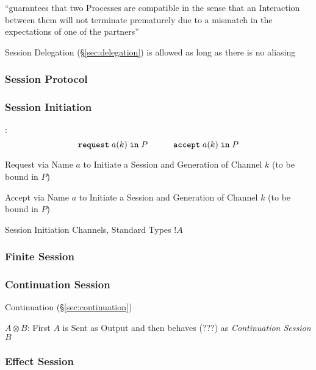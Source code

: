 ``guarantees that two Processes are compatible in the sense that an
Interaction between them will not terminate prematurely due to a
mismatch in the expectations of one of the partners''
\cite{gay-vasconcelos10}

Session Delegation (\S\ref{sec:delegation}) is allowed as long as
there is no aliasing



\subsubsection{Session Protocol}\label{sec:session_protocol}

\subsubsection{Session Initiation}\label{sec:session_initiation}

\cite{honda-vasconcelos-kubo98}:
\[
  \mathtt{request} \; a(k) \; \mathtt{in} \; P
  \quad\quad\quad
  \mathtt{accept} \; a(k) \; \mathtt{in} \; P
\]

Request via Name $a$ to Initiate a Session and Generation of Channel
$k$ (to be bound in $P$)

Accept via Name $a$ to Initiate a Session and Generation of Channel
$k$ (to be bound in $P$)

Session Initiation Channels, Standard Types $!A$



\subsubsection{Finite Session}\label{sec:finite_session}

\subsubsection{Continuation Session}\label{sec:continuation_session}

Continuation (\S\ref{sec:continuation})

$A \otimes B$: First $A$ is Sent as Output and then behaves (???) as
\emph{Continuation Session} $B$



\subsubsection{Effect Session}\label{sec:effect_session}

\cite{orchard-yoshida16}

